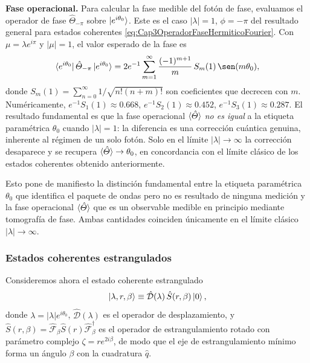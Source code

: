                \textbf{Fase operacional.} Para calcular la fase medible del fotón de fase, evaluamos el operador de fase $\hat{\Theta}_{-\pi}$ sobre $\ket{e^{i\theta_0}}$. Este es el caso $|\lambda|=1$, $\phi=-\pi$ del resultado general para estados coherentes \ref{eq:Cap3OperadorFaseHermiticoFourier}. Con $\mu = \lambda e^{i\pi}$ y $|\mu|=1$, el valor esperado de la fase es
                \begin{equation}\label{eq:Cap3FaseOperacionalFoton}
                    \bra{e^{i\theta_0}}\hat{\Theta}_{-\pi}\ket{e^{i\theta_0}} = 2e^{-1}\sum_{m=1}^{\infty}\frac{(-1)^{m+1}}{m}\,S_m(1)\,\sen(m\theta_0),
                \end{equation}
                donde $S_m(1) = \sum_{n=0}^{\infty}1/\sqrt{n!(n+m)!}$ son coeficientes que decrecen con $m$. Numéricamente, $e^{-1}S_1(1)\approx 0.668$, $e^{-1}S_2(1)\approx 0.452$, $e^{-1}S_3(1)\approx 0.287$. El resultado fundamental es que la fase operacional $\braket{\hat{\Theta}}$ \textit{no es igual} a la etiqueta paramétrica $\theta_0$ cuando $|\lambda|=1$: la diferencia es una corrección cuántica genuina, inherente al régimen de un solo fotón. Solo en el límite $|\lambda|\to\infty$ la corrección desaparece y se recupera $\braket{\hat{\Theta}}\to\theta_0$, en concordancia con el límite clásico de los estados coherentes obtenido anteriormente.

                Esto pone de manifiesto la distinción fundamental entre la etiqueta paramétrica $\theta_0$ que identifica el paquete de ondas pero no es resultado de ninguna medición y la fase operacional $\braket{\hat{\Theta}}$ que es un observable medible en principio mediante tomografía de fase. Ambas cantidades coinciden únicamente en el límite clásico $|\lambda|\to\infty$.

            \subsubsection{Estados coherentes estrangulados}

                Consideremos ahora el estado coherente estrangulado
                \begin{equation}\label{eq:Cap3EstadoCoherenteEstrangulado}
                    \ket{\lambda, r, \beta} \equiv \hat{\mathcal{D}}(\lambda)\,\hat{S}(r,\beta)\ket{0},
                \end{equation}
                donde $\lambda = |\lambda|e^{i\theta_0}$, $\hat{\mathcal{D}}(\lambda)$ es el operador de desplazamiento, y $\hat{S}(r,\beta) = \hat{\mathcal{F}}_\beta\hat{S}(r)\hat{\mathcal{F}}_\beta^\dagger$ es el operador de estrangulamiento rotado con parámetro complejo $\zeta = re^{2i\beta}$, de modo que el eje de estrangulamiento mínimo forma un ángulo $\beta$ con la cuadratura $\hat{q}$.

